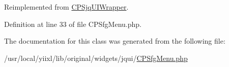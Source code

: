 Reimplemented from \hyperlink{classCPSjqUIWrapper_ae357f9dc377f7de0d12010b2ced28cbc}{CPSjqUIWrapper}.



Definition at line 33 of file CPSfgMenu.php.



The documentation for this class was generated from the following file:\begin{DoxyCompactItemize}
\item 
/usr/local/yiixl/lib/original/widgets/jqui/\hyperlink{CPSfgMenu_8php}{CPSfgMenu.php}\end{DoxyCompactItemize}
